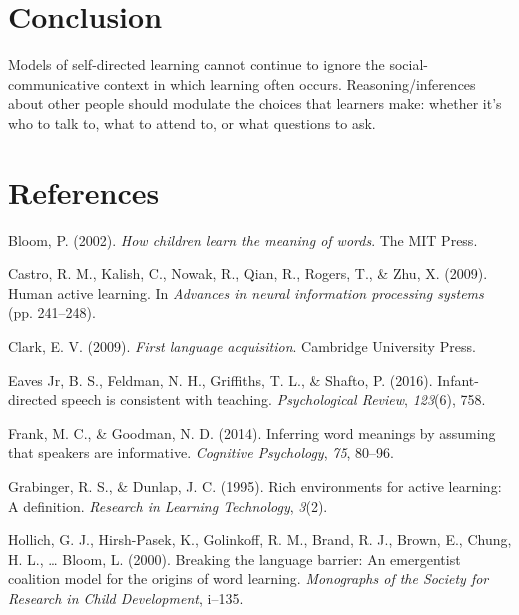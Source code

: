 \documentclass[a4paper,man,apacite,floatsintext]{apa6}
\begin{document}
\section{Conclusion}\label{conclusion}

Models of self-directed learning cannot continue to ignore the
social-communicative context in which learning often occurs.
Reasoning/inferences about other people should modulate the choices that
learners make: whether it's who to talk to, what to attend to, or what
questions to ask.

\newpage

\section{References}\label{references}

\setlength{\parindent}{-0.4in} \setlength{\leftskip}{0.125in} \noindent

\hypertarget{refs}{}
\hypertarget{ref-bloom2002children}{}
Bloom, P. (2002). \emph{How children learn the meaning of words}. The
MIT Press.

\hypertarget{ref-castro2009human}{}
Castro, R. M., Kalish, C., Nowak, R., Qian, R., Rogers, T., \& Zhu, X.
(2009). Human active learning. In \emph{Advances in neural information
processing systems} (pp. 241--248).

\hypertarget{ref-clark2009first}{}
Clark, E. V. (2009). \emph{First language acquisition}. Cambridge
University Press.

\hypertarget{ref-eaves2016infant}{}
Eaves Jr, B. S., Feldman, N. H., Griffiths, T. L., \& Shafto, P. (2016).
Infant-directed speech is consistent with teaching. \emph{Psychological
Review}, \emph{123}(6), 758.

\hypertarget{ref-frank2014inferring}{}
Frank, M. C., \& Goodman, N. D. (2014). Inferring word meanings by
assuming that speakers are informative. \emph{Cognitive Psychology},
\emph{75}, 80--96.

\hypertarget{ref-grabinger1995rich}{}
Grabinger, R. S., \& Dunlap, J. C. (1995). Rich environments for active
learning: A definition. \emph{Research in Learning Technology},
\emph{3}(2).

\hypertarget{ref-hollich2000breaking}{}
Hollich, G. J., Hirsh-Pasek, K., Golinkoff, R. M., Brand, R. J., Brown,
E., Chung, H. L., \ldots{} Bloom, L. (2000). Breaking the language
barrier: An emergentist coalition model for the origins of word
learning. \emph{Monographs of the Society for Research in Child
Development}, i--135.
\end{document}
